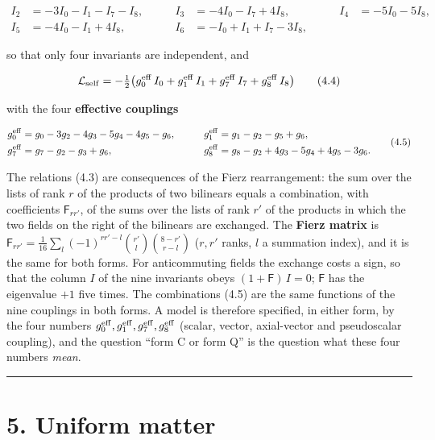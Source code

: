 \documentclass[
  10pt,
]{article}
\begin{document}
\[\begin{aligned}
I_2&=-3I_0-I_1-I_7-I_8,&\qquad I_3&=-4I_0-I_7+4I_8,&\qquad I_4&=-5I_0-5I_8,\\
I_5&=-4I_0-I_1+4I_8,&\qquad I_6&=-I_0+I_1+I_7-3I_8,
\end{aligned}\tag{4.3}\]

so that only four invariants are independent, and

\[\mathcal L_{\rm self}=-\tfrac12\big(g_0^{\rm eff}\,I_0+g_1^{\rm eff}\,I_1+g_7^{\rm eff}\,I_7+g_8^{\rm eff}\,I_8\big)\tag{4.4}\]

with the four \textbf{effective couplings}

\[\begin{aligned}
g_0^{\rm eff}&=g_0-3g_2-4g_3-5g_4-4g_5-g_6,&\qquad g_1^{\rm eff}&=g_1-g_2-g_5+g_6,\\
g_7^{\rm eff}&=g_7-g_2-g_3+g_6,&\qquad g_8^{\rm eff}&=g_8-g_2+4g_3-5g_4+4g_5-3g_6.
\end{aligned}\tag{4.5}\]

The relations (4.3) are consequences of the Fierz rearrangement: the sum
over the lists of rank \(r\) of the products of two bilinears equals a
combination, with coefficients \(\mathsf F_{rr'}\), of the sums over the
lists of rank \(r'\) of the products in which the two fields on the
right of the bilinears are exchanged. The \textbf{Fierz matrix} is
\(\mathsf F_{rr'}=\tfrac1{16}\sum_l(-1)^{rr'-l}\binom{r'}{l}\binom{8-r'}{r-l}\)
(\(r,r'\) ranks, \(l\) a summation index), and it is the same for both
forms. For anticommuting fields the exchange costs a sign, so that the
column \(I\) of the nine invariants obeys \((1+\mathsf F)\,I=0\);
\(\mathsf F\) has the eigenvalue \(+1\) five times. The combinations
(4.5) are the same functions of the nine couplings in both forms. A
model is therefore specified, in either form, by the four numbers
\(g_0^{\rm eff},g_1^{\rm eff},g_7^{\rm eff},g_8^{\rm eff}\) (scalar,
vector, axial-vector and pseudoscalar coupling), and the question ``form
C or form Q'' is the question what these four numbers \emph{mean}.

\begin{center}\rule{0.5\linewidth}{0.5pt}\end{center}

\hypertarget{uniform-matter}{%
\section{5. Uniform matter}\label{uniform-matter}}
\end{document}
